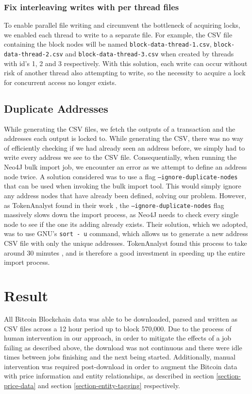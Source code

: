 \subsubsection{Fix interleaving writes with per thread files} 
To enable parallel file writing and circumvent the bottleneck of acquiring locks, we enabled each thread to write to a separate file. For example, the CSV file containing the block nodes will be named \texttt{block-data-thread-1.csv}, \texttt{block-data-thread-2.csv} and \texttt{block-data-thread-3.csv} when created by threads with id's 1, 2 and 3 respectively. With this solution, each write can occur without risk of another thread also attempting to write, so the necessity to acquire a lock for concurrent access no longer exists. 

\subsection{Duplicate Addresses}
While generating the CSV files, we fetch the outputs of a transaction and the addresses each output is locked to. While generating the CSV, there was no way of efficiently checking if we had already seen an address before, we simply had to write every address we see to the CSV file. Consequentially, when running the Neo4J bulk import job, we encounter an error as we attempt to define an address node twice. A solution considered was to use a flag \texttt{--ignore-duplicate-nodes} that can be used when invoking the bulk import tool. This would simply ignore any address nodes that have already been defined, solving our problem. However, as TokenAnalyst found in their work \cite{RefWorks:doc:5c98e0cde4b044512c0b8641}, the \texttt{--ignore-duplicate-nodes} flag massively slows down the import process, as Neo4J needs to check every single node to see if the one its adding already exists. Their solution, which we adopted, was to use GNU's \texttt{sort - u} command, which allows us to generate a new address CSV file with only the unique addresses. TokenAnalyst found this process to take around 30 minutes \cite{RefWorks:doc:5c98e0cde4b044512c0b8641}, and is therefore a good investment in speeding up the entire import process. 


\section{Result}
All Bitcoin Blockchain data was able to be downloaded, parsed and written as CSV files across a 12 hour period up to block 570,000. Due to the process of human intervention in our approach, in order to mitigate the effects of a job failing as described above, the download was not continuous and there were idle times between jobs finishing and the next being started. Additionally, manual intervention was required post-download in order to augment the Bitcoin data with price information and entity relationships, as described in section \ref{section-price-data} and section \ref{section-entity-tagging} respectively. 